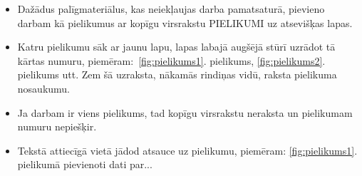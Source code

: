 \begin{itemize}
    \item Dažādus palīgmateriālus, kas neiekļaujas darba pamatsaturā, pievieno darbam kā pielikumus ar kopīgu virsrakstu PIELIKUMI uz atsevišķas lapas.
    \item Katru pielikumu sāk ar jaunu lapu, lapas labajā augšējā stūrī uzrādot tā kārtas numuru, piemēram:~\ref{fig:pielikums1}. pielikums, \ref{fig:pielikums2}. pielikums utt. Zem šā uzraksta, nākamās rindiņas vidū, raksta pielikuma nosaukumu.
    \item Ja darbam ir viens pielikums, tad kopīgu virsrakstu neraksta un pielikumam numuru nepiešķir.
    \item Tekstā attiecīgā vietā jādod atsauce uz pielikumu, piemēram: \ref{fig:pielikums1}. pielikumā pievienoti
dati par...
\end{itemize}



